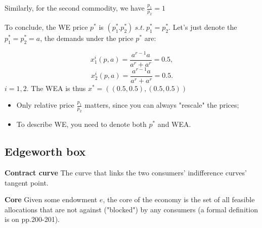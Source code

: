 \documentclass{article}
\begin{document}
Similarly, for the second commodity, we have  $\frac{p_1}{p_2} = 1$

To conclude, the WE price $p^*$ is $(p^*_1.p^*_2) \ s.t.\ p^*_1=p^*_2$. Let's just denote the $p^*_1=p^*_2 = a$, the demands under the price $p^*$ are:

$$x^i_1(p,a) = \frac{a^{r-1} a}{a^r+a^r} = 0.5 ,$$
$$x^i_2(p,a) = \frac{a^{r-1} a}{a^r+a^r} = 0.5.$$
$i = 1,2$. The WEA is thus $x^* = ((0.5,0.5),(0.5,0.5))$
\begin{mdframed}[backgroundcolor=blue!20,linecolor=white]

\begin{itemize}
\item Only relative price $\frac{p_1}{p_2}$ matters, since you can always "rescale" the prices;
\item To describe WE, you need to denote both $p^*$ and WEA.
\end{itemize}
\end{mdframed}



\subsection{Edgeworth box}

\begin{mdframed}[backgroundcolor=blue!20,linecolor=white]
\textbf{Contract curve} The curve that links the two consumers' indifference curves' tangent point.

\textbf{Core} Given some endowment $e$, the core of the economy is the set of all feasible allocations that are not against ("blocked") by any consumers (a formal definition is on pp.200-201).

\begin{center}
\label{fig:c1}
\end{center}
\end{mdframed}
\end{document}
